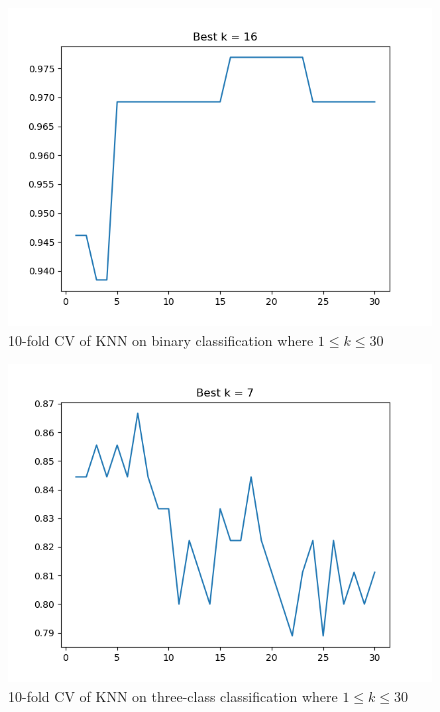 \documentclass[10pt]{article}
\begin{document}
\begin{itemize}
\begin{figure}[H]
\centering
  \includegraphics{code/knn-cv-binary.png}
 \caption{10-fold CV of KNN on binary classification where $1 \leq k \leq 30$}
\end{figure}

\begin{figure}[H]
\centering
  \includegraphics[width=\linewidth]{code/knn-cv-three.png}
 \caption{10-fold CV of KNN on three-class classification where $1 \leq k \leq 30$}
\end{figure}



\end{itemize}
\end{document}
